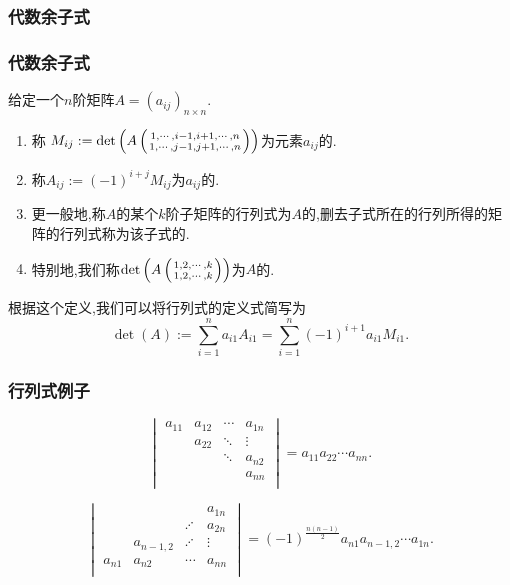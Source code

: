 \subsubsection{代数余子式}
\begin{frame}\frametitle{代数余子式}
\begin{definition}
给定一个$n$阶矩阵$A=(a_{ij})_{n\times n}$.
\pp
\begin{enumerate}
\item 称 $M_{ij}:=\det\left(A\left({{1,\cdots,i-1,i+1,\cdots,n}\atop{1,\cdots,j-1,j+1,\cdots,n}}\right)\right)$为元素$a_{ij}$的.
\pp
\item 称$A_{ij}:=(-1)^{i+j}M_{ij}$为$a_{ij}$的.
\pp
\item 更一般地,称$A$的某个$k$阶子矩阵的行列式为$A$的,删去子式所在的行列所得的矩阵的行列式称为该子式的.
\pp
\item 特别地,我们称$\det\left(A\left({{1,2,\cdots,k}\atop{1,2,\cdots,k}}\right)\right)$为$A$的.
\end{enumerate}
\end{definition}
\pp
根据这个定义,我们可以将行列式的定义式简写为
\[\boxed{\det(A) := \sum_{i=1}^na_{i1}A_{i1} = \sum_{i=1}^{n}(-1)^{i+1}a_{i1}M_{i1}.}\]
\end{frame}






\begin{frame}\frametitle{行列式例子}
\begin{example}
\[\begin{vmatrix}
a_{11}&a_{12}&\cdots&a_{1n}\\
  &a_{22}&\ddots&\vdots\\
  &      &\ddots&a_{n2}\\
  &      &      &a_{nn}\\
\end{vmatrix}=a_{11}a_{22}\cdots a_{nn}.\]
\end{example}
\begin{example}
\[\begin{vmatrix}
  &      &      &a_{1n}\\
  &      &\iddots&a_{2n}\\
  & a_{n-1,2}&\iddots&\vdots\\
a_{n1} & a_{n2} & \cdots & a_{nn}\\
\end{vmatrix}=(-1)^{\frac{n(n-1)}{2}}a_{n1}a_{n-1,2}\cdots a_{1n}.\]
\end{example}
\end{frame}


